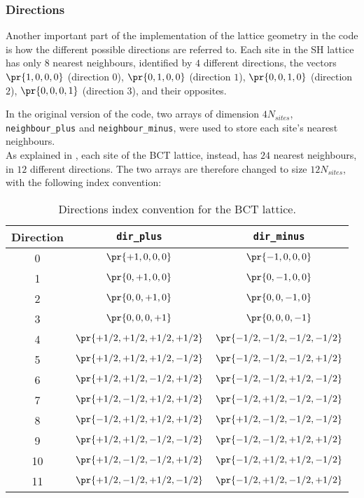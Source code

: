 \subsubsection{Directions}
Another important part of the implementation of the lattice geometry in the code is how the different possible directions are referred to.
Each site in the SH lattice has only $8$ nearest neighbours, identified by $4$ different directions, the vectors $\pr{1,0,0,0}$ (direction $0$), $\pr{0,1,0,0}$ (direction $1$), $\pr{0,0,1,0}$ (direction $2$), $\pr{0,0,0,1}$ (direction $3$), and their opposites.

In the original version of the code, two arrays of dimension $4N_{sites}$, \texttt{neighbour\_plus} and \texttt{neighbour\_minus}, were used to store each site's nearest neighbours.\\
As explained in , each site of the BCT lattice, instead, has $24$ nearest neighbours, in $12$ different directions.
The two arrays are therefore changed to size $12N_{sites}$, with the following index convention:
\begin{table}[!htbp]
    \centering
    \begin{tabular}{ |c|c|c| }
        \hline
        Direction & \texttt{dir\_plus}  & \texttt{dir\_minus}  \\\hline\hline
        0  & $\pr{  +1,   0,   0,   0}$ & $\pr{  -1,   0,   0,   0}$ \\\hline
        1  & $\pr{   0,  +1,   0,   0}$ & $\pr{   0,  -1,   0,   0}$ \\\hline
        2  & $\pr{   0,   0,  +1,   0}$ & $\pr{   0,   0,  -1,   0}$ \\\hline
        3  & $\pr{   0,   0,   0,  +1}$ & $\pr{   0,   0,   0,  -1}$ \\\hline
        4  & $\pr{+1/2,+1/2,+1/2,+1/2}$ & $\pr{-1/2,-1/2,-1/2,-1/2}$ \\\hline
        5  & $\pr{+1/2,+1/2,+1/2,-1/2}$ & $\pr{-1/2,-1/2,-1/2,+1/2}$ \\\hline
        6  & $\pr{+1/2,+1/2,-1/2,+1/2}$ & $\pr{-1/2,-1/2,+1/2,-1/2}$ \\\hline
        7  & $\pr{+1/2,-1/2,+1/2,+1/2}$ & $\pr{-1/2,+1/2,-1/2,-1/2}$ \\\hline
        8  & $\pr{-1/2,+1/2,+1/2,+1/2}$ & $\pr{+1/2,-1/2,-1/2,-1/2}$ \\\hline
        9  & $\pr{+1/2,+1/2,-1/2,-1/2}$ & $\pr{-1/2,-1/2,+1/2,+1/2}$ \\\hline
        10 & $\pr{+1/2,-1/2,-1/2,+1/2}$ & $\pr{-1/2,+1/2,+1/2,-1/2}$ \\\hline
        11 & $\pr{+1/2,-1/2,+1/2,-1/2}$ & $\pr{-1/2,+1/2,-1/2,+1/2}$ \\\hline
    \end{tabular}
    \caption{Directions index convention for the BCT lattice.}
    \label{4T:DirsBCT}
\end{table}\\
